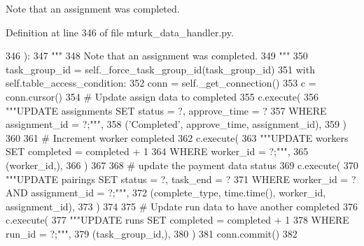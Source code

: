 \begin{DoxyVerb}Note that an assignment was completed.
\end{DoxyVerb}
 

Definition at line 346 of file mturk\+\_\+data\+\_\+handler.\+py.


\begin{DoxyCode}
346     ):
347         \textcolor{stringliteral}{"""}
348 \textcolor{stringliteral}{        Note that an assignment was completed.}
349 \textcolor{stringliteral}{        """}
350         task\_group\_id = self.\_force\_task\_group\_id(task\_group\_id)
351         with self.table\_access\_condition:
352             conn = self.\_get\_connection()
353             c = conn.cursor()
354             \textcolor{comment}{# Update assign data to completed}
355             c.execute(
356                 \textcolor{stringliteral}{"""UPDATE assignments SET status = ?, approve\_time = ?}
357 \textcolor{stringliteral}{                         WHERE assignment\_id = ?;"""},
358                 (\textcolor{stringliteral}{'Completed'}, approve\_time, assignment\_id),
359             )
360 
361             \textcolor{comment}{# Increment worker completed}
362             c.execute(
363                 \textcolor{stringliteral}{"""UPDATE workers SET completed = completed + 1}
364 \textcolor{stringliteral}{                         WHERE worker\_id = ?;"""},
365                 (worker\_id,),
366             )
367 
368             \textcolor{comment}{# update the payment data status}
369             c.execute(
370                 \textcolor{stringliteral}{"""UPDATE pairings SET status = ?, task\_end = ?}
371 \textcolor{stringliteral}{                         WHERE worker\_id = ? AND assignment\_id = ?;"""},
372                 (complete\_type, time.time(), worker\_id, assignment\_id),
373             )
374 
375             \textcolor{comment}{# Update run data to have another completed}
376             c.execute(
377                 \textcolor{stringliteral}{"""UPDATE runs SET completed = completed + 1}
378 \textcolor{stringliteral}{                         WHERE run\_id = ?;"""},
379                 (task\_group\_id,),
380             )
381             conn.commit()
382 
\end{DoxyCode}
\mbox{\label{classparlai_1_1mturk_1_1core_1_1mturk__data__handler_1_1MTurkDataHandler_ac4dc07d7412b426c29678b517daf6094}} 
